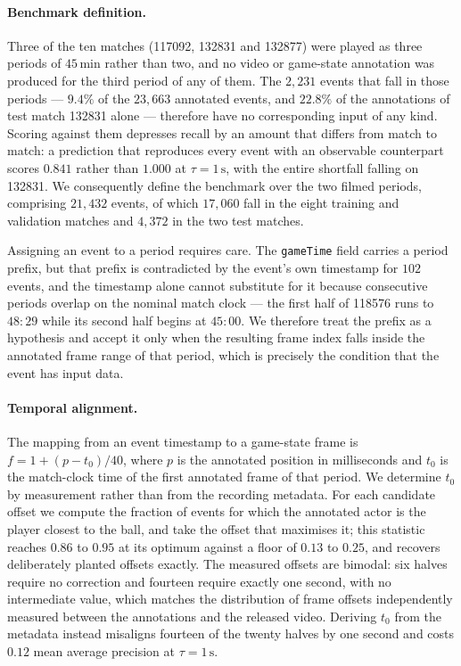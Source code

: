 \paragraph{Benchmark definition.}
Three of the ten matches (117092, 132831 and 132877) were played as three periods of
$45\,\text{min}$ rather than two, and no video or game-state annotation was produced for the
third period of any of them. The $2{,}231$ events that fall in those periods --- $9.4\%$ of
the $23{,}663$ annotated events, and $22.8\%$ of the annotations of test match 132831 alone
--- therefore have no corresponding input of any kind. Scoring against them depresses recall
by an amount that differs from match to match: a prediction that reproduces every event with
an observable counterpart scores $0.841$ rather than $1.000$ at $\tau = 1\,\text{s}$, with the
entire shortfall falling on 132831. We consequently define the benchmark over the two filmed
periods, comprising $21{,}432$ events, of which $17{,}060$ fall in the eight training and
validation matches and $4{,}372$ in the two test matches.

Assigning an event to a period requires care. The \texttt{gameTime} field carries a period
prefix, but that prefix is contradicted by the event's own timestamp for $102$ events, and the
timestamp alone cannot substitute for it because consecutive periods overlap on the nominal
match clock --- the first half of 118576 runs to $48{:}29$ while its second half begins at
$45{:}00$. We therefore treat the prefix as a hypothesis and accept it only when the resulting
frame index falls inside the annotated frame range of that period, which is precisely the
condition that the event has input data.

\paragraph{Temporal alignment.}
The mapping from an event timestamp to a game-state frame is
$f = 1 + (p - t_0)/40$, where $p$ is the annotated position in milliseconds and $t_0$ is the
match-clock time of the first annotated frame of that period. We determine $t_0$ by
measurement rather than from the recording metadata. For each candidate offset we compute the
fraction of events for which the annotated actor is the player closest to the ball, and take
the offset that maximises it; this statistic reaches $0.86$ to $0.95$ at its optimum against a
floor of $0.13$ to $0.25$, and recovers deliberately planted offsets exactly. The measured
offsets are bimodal: six halves require no correction and fourteen require exactly one second,
with no intermediate value, which matches the distribution of frame offsets independently
measured between the annotations and the released video. Deriving $t_0$ from the metadata
instead misaligns fourteen of the twenty halves by one second and costs $0.12$ mean average
precision at $\tau = 1\,\text{s}$.

